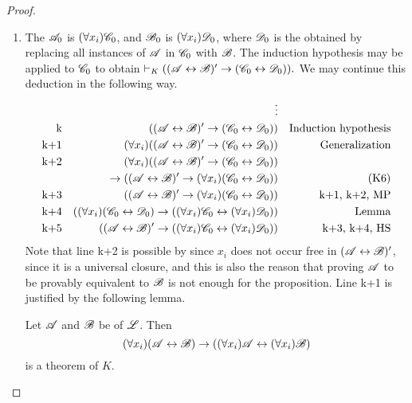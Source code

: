 \begin{proposition}
\begin{proof}
\begin{enumerate}
      \item The \wf{} \(\mathscr{A}_0\) is \((\forall x_i)\mathscr{C}_0\), and \(\mathscr{B}_0\) is \((\forall x_i)\mathscr{D}_0\), where \(\mathscr{D}_0\) is the \wf{} obtained by replacing all instances of \(\mathscr{A}\) in \(\mathscr{C}_0\) with \(\mathscr{B}\). The induction hypothesis may be applied to \(\mathscr{C}_0\) to obtain \(\vdash_{K} ((\mathscr{A} \leftrightarrow \mathscr{B})' \rightarrow (\mathscr{C}_0 \leftrightarrow \mathscr{D}_0)).\) We may continue this deduction in the following way.
          \begin{align*}
            &&
            \vdots&&
            \\
            \text{k}&&
            ((\mathscr{A} \leftrightarrow \mathscr{B})' \rightarrow (\mathscr{C}_0 \leftrightarrow \mathscr{D}_0))&&
            \text{Induction hypothesis}\\
            \text{k+1}&&
            (\forall x_i)((\mathscr{A} \leftrightarrow \mathscr{B})' \rightarrow (\mathscr{C}_0 \leftrightarrow \mathscr{D}_0))&&
            \text{Generalization}\\
            \text{k+2}&&
            (\forall x_i)((\mathscr{A} \leftrightarrow \mathscr{B})' \rightarrow (\mathscr{C}_0 \leftrightarrow \mathscr{D}_0))&&
            \\
            &&
            \rightarrow ((\mathscr{A} \leftrightarrow \mathscr{B})' \rightarrow (\forall x_i)(\mathscr{C}_0 \leftrightarrow \mathscr{D}_0))&&
            \text{(K6)}\\
            \text{k+3}&&
            ((\mathscr{A} \leftrightarrow \mathscr{B})' \rightarrow (\forall x_i)(\mathscr{C}_0 \leftrightarrow \mathscr{D}_0))&&
            \text{k+1, k+2, MP}\\
            \text{k+4}&&
            ((\forall x_i)(\mathscr{C}_0 \leftrightarrow \mathscr{D}_0) \rightarrow ((\forall x_i)\mathscr{C}_0 \leftrightarrow (\forall x_i)\mathscr{D}_0))&&
            \text{Lemma}\\
            \text{k+5}&&
            ((\mathscr{A} \leftrightarrow \mathscr{B})' \rightarrow ((\forall x_i)\mathscr{C}_0 \leftrightarrow (\forall x_i)\mathscr{D}_0))&&
            \text{k+3, k+4, HS}
          \end{align*}
        Note that line k+2 is possible by since \(x_i\) does not occur free in \((\mathscr{A} \leftrightarrow \mathscr{B})'\), since it is a universal closure, and this is also the reason that proving \(\mathscr{A}\) to be provably equivalent to \(\mathscr{B}\) is not enough for the proposition. Line k+1 is justified by the following lemma.
        \begin{lemma*}
          Let \(\mathscr{A}\) and \(\mathscr{B}\) be \wfs{} of \(\mathscr{L}\). Then
            \[(\forall x_i)(\mathscr{A} \leftrightarrow \mathscr{B}) \rightarrow ((\forall x_i) \mathscr{A} \leftrightarrow (\forall x_i)\mathscr{B})\]
            is a theorem of \(K\).


\end{lemma*}
\end{enumerate}
\end{proof}
\end{proposition}
